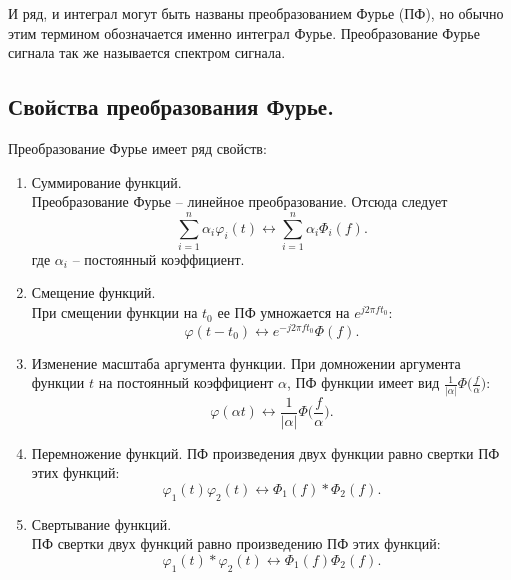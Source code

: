 \documentclass[a4paper,14pt]{extarticle}
\begin{document}
И ряд, и интеграл могут быть названы преобразованием Фурье (ПФ), но обычно этим термином обозначается именно интеграл Фурье. Преобразование Фурье сигнала так же называется спектром сигнала.

\subsection{Свойства преобразования Фурье.}

Преобразование Фурье имеет ряд свойств:

\begin{enumerate}

\item Суммирование функций. \\ Преобразование Фурье -- линейное преобразование. Отсюда следует 
\begin{equation*}
\sum_{i=1}^n \alpha_i \varphi_i (t) \leftrightarrow  \sum_{i=1}^n \alpha_i \Phi_i (f).
\end{equation*}   
где $\alpha_i$ -- постоянный коэффициент.

\item Смещение функций. \\ При смещении функции на $t_0$ ее ПФ умножается на $e^{j 2 \pi f t_0}$:
\begin{equation*}
\varphi (t - t_0) \leftrightarrow e^{-j 2 \pi f t_0} \Phi (f).
\end{equation*}

\item Изменение масштаба аргумента функции.
При домножении аргумента функции $t$ на постоянный коэффициент $\alpha$, ПФ функции имеет вид $\frac{1}{|\alpha|} \Phi \big(\frac{f}{\alpha}\big)$:
\begin{equation*}
\varphi(\alpha t) \leftrightarrow \frac{1}{|\alpha|} \Phi \bigg(\frac{f}{\alpha}\bigg).
\end{equation*}

\item Перемножение функций.  ПФ произведения двух функции равно свертки ПФ этих функций:
\begin{equation*}
\varphi_1 (t) \varphi_2 (t) \leftrightarrow \Phi_1(f) * \Phi_2(f). 
\end{equation*}

\item Свертывание функций. \\ ПФ свертки двух функций равно произведению ПФ этих функций:
\begin{equation*}
\varphi_1(t) * \varphi_2(t) \leftrightarrow  \Phi_1(f)  \Phi_2(f).
\end{equation*}


\end{enumerate}
\end{document}
